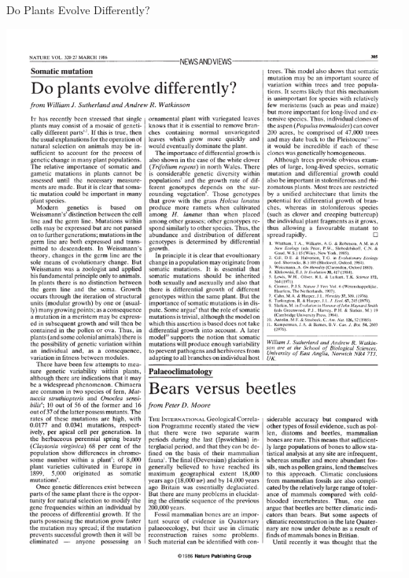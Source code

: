 \documentclass{beamer}
\begin{document}
\begin{frame}{Do Plants Evolve Differently?}

	\includegraphics[trim={1.2cm 23cm 1.2cm 0},clip,width=\linewidth]{do_plants_evolve_differently.pdf}

	\vfill


\end{frame}
\end{document}

